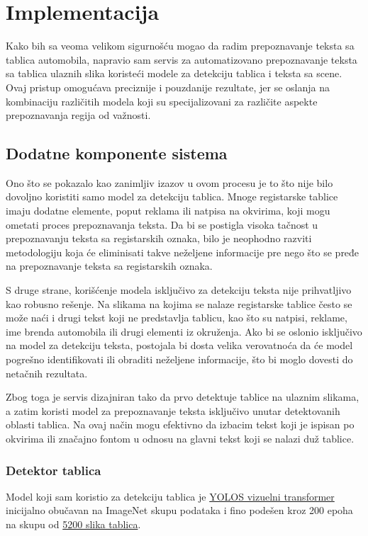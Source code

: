 \documentclass[a4paper,12pt]{article}
\begin{document}
	\section{Implementacija}	
	Kako bih sa veoma velikom sigurnošću mogao da radim prepoznavanje teksta sa tablica automobila, napravio sam servis za automatizovano prepoznavanje teksta sa tablica ulaznih slika koristeći modele za detekciju tablica i teksta sa scene. Ovaj pristup omogućava preciznije i pouzdanije rezultate, jer se oslanja na kombinaciju različitih modela koji su specijalizovani za različite aspekte prepoznavanja regija od važnosti.
	
	\subsection{Dodatne komponente sistema}
	Ono što se pokazalo kao zanimljiv izazov u ovom procesu je to što nije bilo dovoljno koristiti samo model za detekciju tablica. Mnoge registarske tablice imaju dodatne elemente, poput reklama ili natpisa na okvirima, koji mogu ometati proces prepoznavanja teksta. Da bi se postigla visoka tačnost u prepoznavanju teksta sa registarskih oznaka, bilo je neophodno razviti metodologiju koja će eliminisati takve neželjene informacije pre nego što se pređe na prepoznavanje teksta sa registarskih oznaka.
	
	S druge strane, korišćenje modela isključivo za detekciju teksta nije prihvatljivo kao robusno rešenje. Na slikama na kojima se nalaze registarske tablice često se može naći i drugi tekst koji ne predstavlja tablicu, kao što su natpisi, reklame, ime brenda automobila ili drugi elementi iz okruženja. Ako bi se oslonio isključivo na model za detekciju teksta, postojala bi dosta velika verovatnoća da će model pogrešno identifikovati ili obraditi neželjene informacije, što bi moglo dovesti do netačnih rezultata.
	
	Zbog toga je servis dizajniran tako da prvo detektuje tablice na ulaznim slikama, a zatim koristi model za prepoznavanje teksta isključivo unutar detektovanih oblasti tablica. Na ovaj način mogu efektivno da izbacim tekst koji je ispisan po okvirima ili značajno fontom u odnosu na glavni tekst koji se nalazi duž tablice.
	
	\subsubsection{Detektor tablica}
	Model koji sam koristio za detekciju tablica je \href{https://huggingface.co/nickmuchi/yolos-small-finetuned-license-plate-detection}{YOLOS vizuelni transformer} \cite{fang2021looksequencerethinkingtransformer} inicijalno obučavan na ImageNet skupu podataka i fino podešen kroz 200 epoha na skupu od \href{https://universe.roboflow.com/objectdetection-jhgr1/license-plates-recognition/dataset/2}{5200 slika tablica}.
	
\end{document}
